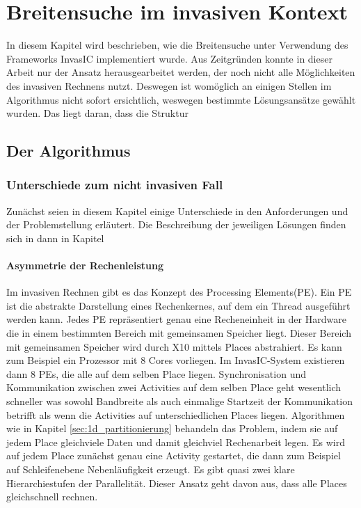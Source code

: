 
\chapter{Breitensuche im invasiven Kontext} %
\label{cha:breitensuche_im_invasiven_kontext}
In diesem Kapitel wird beschrieben, wie die Breitensuche unter Verwendung des Frameworks InvasIC implementiert wurde. Aus Zeitgründen konnte in dieser Arbeit nur der Ansatz herausgearbeitet werden, der noch nicht alle Möglichkeiten des invasiven Rechnens nutzt. Deswegen ist womöglich an einigen Stellen im Algorithmus nicht sofort ersichtlich, weswegen bestimmte Lösungsansätze gewählt wurden. Das liegt daran, dass die Struktur

\section{Der Algorithmus} %
\label{sec:der_algorithmus}

\subsection{Unterschiede zum nicht invasiven Fall} %
\label{sub:unterschiede_zum_nicht_invasiven_fall}
Zunächst seien in diesem Kapitel einige Unterschiede in den Anforderungen und der Problemstellung erläutert. Die Beschreibung der jeweiligen Lösungen finden sich in dann in Kapitel %

\subsubsection{Asymmetrie der Rechenleistung} %
\label{ssub:asymmetrie_der_rechenleistung}
Im invasiven Rechnen gibt es das Konzept des Processing Elements(PE). Ein PE ist die abstrakte Darstellung eines Rechenkernes, auf dem ein Thread ausgeführt werden kann. Jedes PE repräsentiert genau eine Recheneinheit in der Hardware die in einem bestimmten Bereich mit gemeinsamen Speicher liegt. Dieser Bereich mit gemeinsamen Speicher wird durch X10 mittels Places abstrahiert. Es kann zum Beispiel ein Prozessor mit 8 Cores vorliegen. Im InvasIC-System existieren dann 8 PEs, die alle auf dem selben Place liegen. Synchronisation und Kommunikation zwischen zwei Activities auf dem selben Place geht wesentlich schneller was sowohl Bandbreite als auch einmalige Startzeit der Kommunikation betrifft als wenn die Activities auf unterschiedlichen Places liegen. Algorithmen wie in Kapitel \ref{sec:1d_partitionierung} behandeln das Problem, indem sie auf jedem Place gleichviele Daten und damit gleichviel Rechenarbeit legen. Es wird auf jedem Place zunächst genau eine Activity gestartet, die dann zum Beispiel auf Schleifenebene Nebenläufigkeit erzeugt. Es gibt quasi zwei klare Hierarchiestufen der Parallelität. Dieser Ansatz geht davon aus, dass alle Places gleichschnell rechnen.

